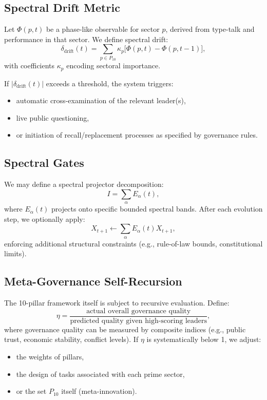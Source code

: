 \documentclass[11pt]{article}
\begin{document}
\subsection{Spectral Drift Metric}

Let \(\Phi(p,t)\) be a phase-like observable for sector \(p\), derived from type-talk and performance in that sector. We define spectral drift:
\[
  \delta_{\text{drift}}(t) = \sum_{p \in P_{10}} \kappa_p \big[\Phi(p,t) - \Phi(p,t-1)\big],
\]
with coefficients \(\kappa_p\) encoding sectoral importance.

If \(|\delta_{\text{drift}}(t)|\) exceeds a threshold, the system triggers:
\begin{itemize}[leftmargin=1.5em]
    \item automatic cross-examination of the relevant leader(s),
    \item live public questioning,
    \item or initiation of recall/replacement processes as specified by governance rules.
\end{itemize}

\subsection{Spectral Gates}

We may define a spectral projector decomposition:
\[
  I = \sum_{\alpha} E_\alpha(t),
\]
where \(E_\alpha(t)\) projects onto specific bounded spectral bands. After each evolution step, we optionally apply:
\[
  X_{t+1} \leftarrow \sum_{\alpha} E_\alpha(t) X_{t+1},
\]
enforcing additional structural constraints (e.g., rule-of-law bounds, constitutional limits).

\subsection{Meta-Governance Self-Recursion}

The 10-pillar framework itself is subject to recursive evaluation. Define:
\[
  \eta = \frac{\text{actual overall governance quality}}{\text{predicted quality given high-scoring leaders}},
\]
where governance quality can be measured by composite indices (e.g., public trust, economic stability, conflict levels). If \(\eta\) is systematically below 1, we adjust:
\begin{itemize}[leftmargin=1.5em]
    \item the weights of pillars,
    \item the design of tasks associated with each prime sector,
    \item or the set \(P_{10}\) itself (meta-innovation).
\end{itemize}
\end{document}
